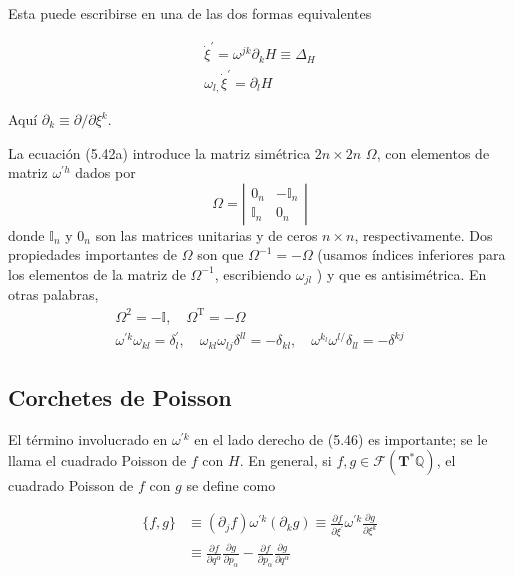 Esta puede escribirse en una de las dos formas equivalentes

$$
\begin{array}{ll}
\dot{\xi}^{\prime}=\omega^{j k} \partial_{k} H \equiv \Delta_{H}\tag{5.42a}\\
\omega_{l,} \dot{\xi}^{\prime}=\partial_{l} H \tag{5.42b}
\end{array}
$$

Aquí $\partial_{k} \equiv \partial / \partial \xi^{k}$.

La ecuación (5.42a) introduce la matriz simétrica $2 n \times 2 n$ $\Omega$, con elementos de matriz $\omega^{\prime h}$ dados por
$$
\Omega=\left|\begin{array}{cc}
0_{n} & -\mathbb{I}_{n}  \tag{5.43}\\
\mathbb{I}_{n} & 0_{n}
\end{array}\right|
$$
donde $\mathbb{I}_{n}$ y $0_{n}$ son las matrices unitarias y de ceros $n \times n$, respectivamente. Dos propiedades importantes de $\Omega$ son que $\Omega^{-1}=-\Omega$ (usamos índices inferiores para los elementos de la matriz de $\Omega^{-1}$, escribiendo $\omega_{j l}$ ) y que es antisimétrica. En otras palabras,
$$
\begin{array}{l}
\Omega^{2}=-\mathbb{I}, \quad \Omega^{\mathrm{T}}=-\Omega \tag{5.44}\\
\omega^{\prime k} \omega_{k l}=\delta_{l}^{\prime}, \quad \omega_{k l} \omega_{l j} \delta^{l l}=-\delta_{k l}, \quad \omega^{k_{l}} \omega^{l /} \delta_{l l}=-\delta^{k j}
\end{array}
$$



\subsection{Corchetes de Poisson}

El término involucrado en $\omega^{\prime k}$ en el lado derecho de (5.46) es importante; se le llama el cuadrado Poisson de $f$ con $H$. En general, si $f, g \in \mathcal{F}\left(\mathbf{T}^{*} \mathbb{Q}\right)$, el cuadrado Poisson de $f$ con $g$ se define como

$$
\begin{aligned}
\{f, g\} & \equiv\left(\partial_{j} f\right) \omega^{\prime k}\left(\partial_{k} g\right) \equiv \frac{\partial f}{\partial \xi^{\prime}} \omega^{\prime k} \frac{\partial g}{\partial \xi^{k}} \\
& \equiv \frac{\partial f}{\partial q^{\alpha}} \frac{\partial g}{\partial p_{\alpha}}-\frac{\partial f}{\partial p_{\alpha}} \frac{\partial g}{\partial q^{\alpha}} \tag{5.47}
\end{aligned}
$$

